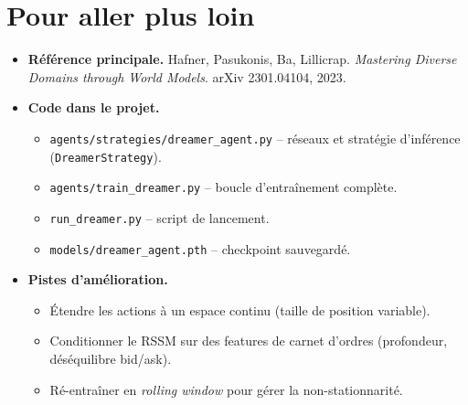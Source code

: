 \documentclass[11pt,a4paper]{article}
\newcommand{\rssm}{RSSM}
\begin{document}
\section{Pour aller plus loin}
\begin{itemize}
    \item \textbf{Référence principale.} Hafner, Pasukonis, Ba, Lillicrap.
          \emph{Mastering Diverse Domains through World Models}. arXiv
          2301.04104, 2023.
    \item \textbf{Code dans le projet.}
    \begin{itemize}
        \item \texttt{agents/strategies/dreamer\_agent.py} -- réseaux et
              stratégie d'inférence (\texttt{DreamerStrategy}).
        \item \texttt{agents/train\_dreamer.py} -- boucle d'entraînement
              complète.
        \item \texttt{run\_dreamer.py} -- script de lancement.
        \item \texttt{models/dreamer\_agent.pth} -- checkpoint sauvegardé.
    \end{itemize}
    \item \textbf{Pistes d'amélioration.}
    \begin{itemize}
        \item Étendre les actions à un espace continu (taille de position
              variable).
        \item Conditionner le \rssm{} sur des features de carnet d'ordres
              (profondeur, déséquilibre bid/ask).
        \item Ré-entraîner en \emph{rolling window} pour gérer la
              non-stationnarité.
    \end{itemize}
\end{itemize}
\end{document}
